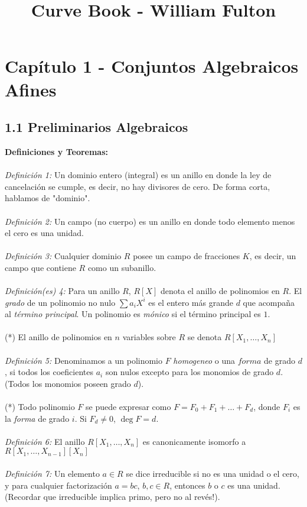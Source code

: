 \documentclass{article}
\begin{document}
\title{Curve Book - William Fulton}
\section*{Capítulo 1 - Conjuntos Algebraicos Afines}
\subsection*{1.1 Preliminarios Algebraicos}
\textbf{Definiciones y Teoremas:}
\\
\\
\textit{Definición 1:} Un dominio entero (integral) es un anillo en donde la ley de cancelación se cumple, es decir, no hay divisores de cero. De forma corta, hablamos de "dominio".
\\
\\
\textit{Definición 2:} Un campo (no cuerpo) es un anillo en donde todo elemento menos el cero es una unidad.
\\
\\
\textit{Definición 3:} Cualquier dominio $R$ posee un campo de fracciones $K$, es decir, un campo que contiene $R$ como un subanillo.
\\
\\
\textit{Definición(es) 4:} Para un anillo $R$, $R[X]$ denota el anillo de polinomios en $R$. El \textit{grado} de un polinomio no nulo $\sum a_i X^{i}$ es el entero más grande $d$ que acompaña al \textit{término principal}. Un polinomio es \textit{mónico} si el término principal es $1$.
\\
\\
(*) El anillo de polinomios en $n$ variables sobre $R$ se denota $R[X_1, \dots , X_n]$
\\
\\
\textit{Definición 5:} Denominamos a un polinomio $F$ \textit{homogeneo} o una $\textit{forma}$ de grado $d$, si todos los coeficientes $a_i$ son nulos excepto para los monomios de grado $d$. (Todos los monomios poseen grado $d$).
\\
\\
(*) Todo polinomio $F$ se puede expresar como $F=F_{0}+F_1 + \dots +F_d$, donde $F_i$ es la \textit{forma} de grado $i$. Si $F_d \neq 0$, $\deg{F}=d$.
\\
\\
\textit{Definición 6:} El anillo $R[X_1 , \dots, X_n]$ es canonicamente isomorfo a $R[X_1 , \dots , X_{n-1}][X_n]$
\\
\\
\textit{Definición 7:} Un elemento $a \in R$ se dice irreducible si no es una unidad o el cero, y para cualquier factorización $a=bc$, $b,c \in R$, entonces $b$ o $c$ es una unidad. (Recordar que irreducible implica primo, pero no al revés!).
\end{document}
